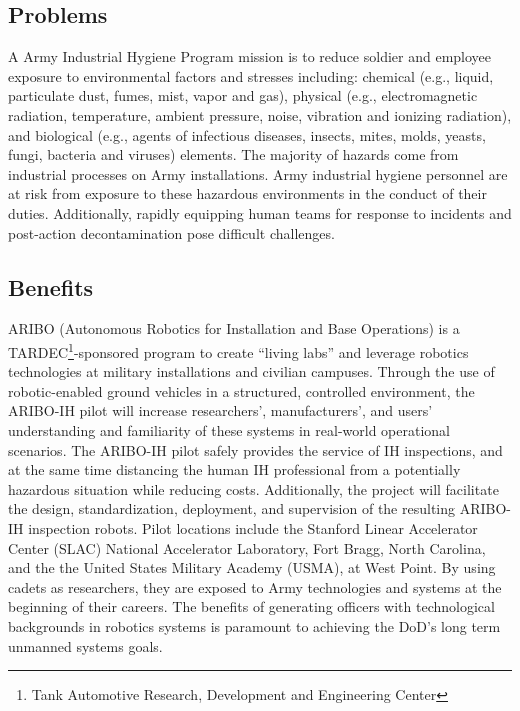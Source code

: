 \subsection{Problems}

A Army Industrial Hygiene Program mission is to reduce soldier and employee exposure to environmental factors and stresses including:  chemical (e.g., liquid, particulate dust, fumes, mist, vapor and gas), physical (e.g., electromagnetic radiation, temperature, ambient pressure, noise, vibration and ionizing radiation), and biological (e.g., agents of infectious diseases, insects, mites, molds, yeasts, fungi, bacteria and viruses) elements\cite{ArmymedPAM40503}. The majority of hazards come from industrial processes on Army installations. Army industrial hygiene personnel are at risk from exposure to these hazardous environments in the conduct of their duties. Additionally, rapidly equipping human teams for response to incidents and post-action decontamination pose difficult challenges.  

\subsection{Benefits}

ARIBO (Autonomous Robotics for Installation and Base Operations) is a TARDEC\footnote{Tank Automotive Research, Development and Engineering Center}-sponsored program to create ``living labs'' and leverage robotics technologies at military installations and civilian campuses. Through the use of robotic-enabled ground vehicles in a structured, controlled environment, the ARIBO-IH pilot will increase researchers’, manufacturers’, and users’ understanding and familiarity of these systems in real-world operational scenarios. The ARIBO-IH pilot safely provides the service of IH inspections, and at the same time distancing the human IH professional from a potentially hazardous situation while reducing costs. Additionally, the project will facilitate the design, standardization, deployment, and supervision of the resulting ARIBO-IH inspection robots. Pilot locations include the Stanford Linear Accelerator Center (SLAC) National Accelerator Laboratory, Fort Bragg, North Carolina, and the the United States Military Academy (USMA), at West Point. By using cadets as researchers, they are exposed to Army technologies and systems at the beginning of their careers. The benefits of generating officers with technological backgrounds in robotics systems is paramount to achieving the DoD’s long term unmanned systems goals.

